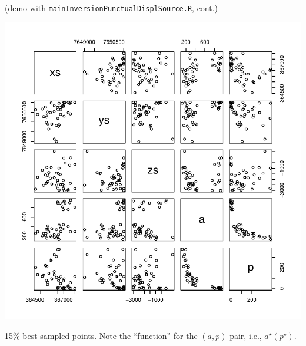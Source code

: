\begin{frame}{}
\small (demo with \texttt{mainInversionPunctualDisplSource.R}, cont.)
\begin{minipage}[c]{0.6\textwidth}
\begin{center}
\includegraphics[width=\textwidth]{4_optimization/figures/pairs_X_good_15percent} 
\end{center}
\end{minipage}
\hspace{0.3cm}
\begin{minipage}[c]{0.3\textwidth}
15\% best sampled points. Note the ``function'' for the $(a,p)$ pair, i.e., $a^\star(p^\star)$.
\end{minipage}
\end{frame}

